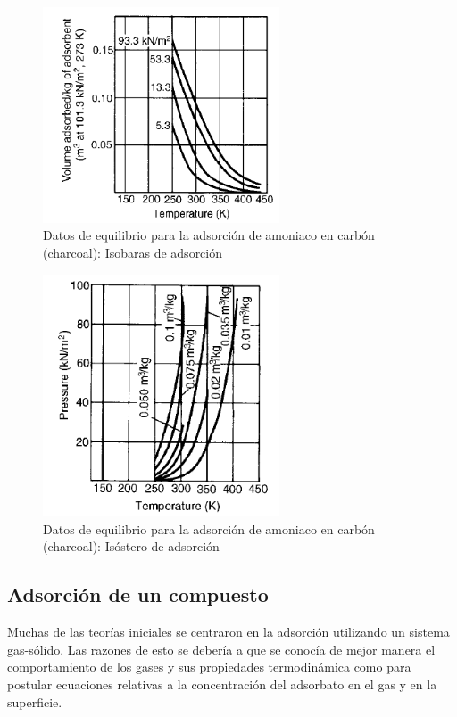 \documentclass[11pt]{book}
\begin{document}
\begin{figure}[H]
    \centering
    \includegraphics[width=7cm]{img/adsorcion/IsobaraEquilibrio.PNG}
    \caption{Datos de equilibrio para la adsorción de amoniaco en carbón (charcoal): Isobaras de adsorción}
    \label{fig:isobarasAdsorcion}
\end{figure}

\begin{figure}[H]
    \centering
    \includegraphics[width=7cm]{img/adsorcion/IsosteroEquilibrio.PNG}
    \caption{Datos de equilibrio para la adsorción de amoniaco en carbón (charcoal): Isóstero de adsorción}
    \label{fig:isosteroAdsorcion}
\end{figure}


\subsection{Adsorción de un compuesto}

Muchas de las teorías iniciales se centraron en la adsorción utilizando un sistema gas-sólido. Las razones de esto se debería a que se conocía de mejor manera el comportamiento de los gases y sus propiedades termodinámica como para postular ecuaciones relativas a la concentración del adsorbato en el gas y en la superficie. 
\end{document}
